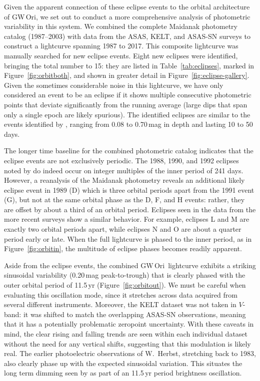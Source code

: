 \documentclass[twocolumn]{aastex61}
\newcommand{\obj}{GW\,Ori}
\begin{document}
Given the apparent connection of these eclipse events to the orbital architecture of \obj, we set out to conduct a more comprehensive analysis of photometric variability in this system. We combined the complete Maidanak photometry catalog (1987--2003) with data from the ASAS, KELT, and ASAS-SN surveys to construct a lightcurve spanning 1987 to 2017. This composite lightcurve was manually searched for new eclipse events.  Eight new eclipses were identified, bringing the total number to 15: they are listed in Table~\ref{tab:eclipses}, marked in Figure~\ref{fig:orbitboth}, and shown in greater detail in Figure~\ref{fig:eclipse-gallery}. Given the sometimes considerable noise in this lightcurve, we have only considered an event to be an eclipse if it shows multiple consecutive photometric points that deviate significantly from the running average (large dips that span only a single epoch are likely spurious). The identified eclipses are similar to the events identified by \citet{shevchenko92,shevchenko98}, ranging from 0.08 to 0.70\,mag in depth and lasting 10 to 50 days. 

The longer time baseline for the combined photometric catalog indicates that the eclipse events are not exclusively periodic.  The 1988, 1990, and 1992 eclipses noted by \citet{shevchenko98} do indeed occur on integer multiples of the inner period of 241 days. However, a reanalysis of the Maidanak photometry reveals an additional likely eclipse event in 1989 (D) which is three orbital periods apart from the 1991 event (G), but not at the same orbital phase as the D, F, and H events: rather, they are offset by about a third of an orbital period. Eclipses seen in the data from the more recent surveys show a similar behavior. For example, eclipses L and M are exactly two orbital periods apart, while eclipses N and O are about a quarter period early or late. When the full lightcurve is phased to the inner period, as in Figure~\ref{fig:orbitin}, the multitude of eclipse phases becomes readily apparent.

Aside from the eclipse events, the combined \obj\ lightcurve exhibits a striking sinusoidal variability (0.20\,mag peak-to-trough) that is clearly phased with the outer orbital period of 11.5\,yr (Figure~\ref{fig:orbitout}). We must be careful when evaluating this oscillation mode, since it stretches across data acquired from several different instruments. Moreover, the KELT dataset was not taken in $V$-band: it was shifted to match the overlapping ASAS-SN observations, meaning that it has a potentially problematic zeropoint uncertainty. With these caveats in mind, the clear rising and falling trends are seen within each individual dataset without the need for any vertical shifts, suggesting that this modulation is likely real. The earlier photoelectric observations of W.~Herbst, stretching back to 1983, also clearly phase up with the expected sinusoidal variation. This situates the long term dimming seen by \citet{shevchenko98} as part of an 11.5\,yr period brightness oscillation.
\end{document}
